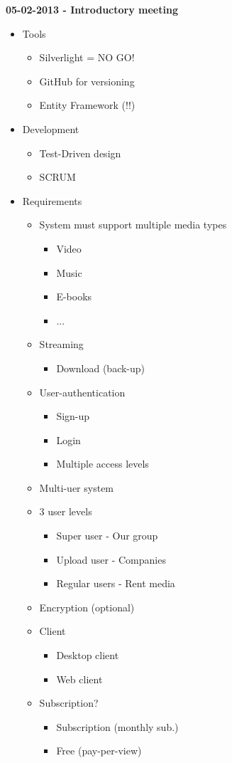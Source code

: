 \documentclass[11pt]{article}
\begin{document}
\begin{landscape}
\begin{multicols}{2}
\textbf{05-02-2013 - Introductory meeting}
\begin{itemize}
\item Tools
\begin{itemize}
\item Silverlight = NO GO!
\item GitHub for versioning
\item Entity Framework (!!)
\end{itemize}
\item Development
\begin{itemize}
\item Test-Driven design
\item SCRUM
\end{itemize}
\item Requirements
\begin{itemize}
\item System must support multiple media types
\begin{itemize}
\item Video
\item Music
\item E-books
\item ...
\end{itemize}
\item Streaming
\begin{itemize}
\item Download (back-up)
\end{itemize}
\item User-authentication
\begin{itemize}
\item Sign-up
\item Login
\item Multiple access levels
\end{itemize}
\item Multi-uer system
\item 3 user levels
\begin{itemize}
\item Super user - Our group
\item Upload user - Companies
\item Regular users - Rent media
\end{itemize}
\item Encryption (optional)
\item Client
\begin{itemize}
\item Desktop client
\item Web client
\end{itemize}
\item Subscription?
\begin{itemize}
\item Subscription (monthly sub.)
\item Free (pay-per-view)
\end{itemize}
\end{itemize}
\end{itemize}
\end{multicols}

\end{landscape}
\end{document}
